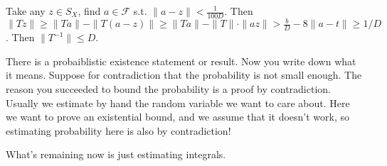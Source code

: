 Take any $z \in S_X$, find $a \in \mathcal{F}$ s.t. $\|a - z\| < \frac{1}{100D}$. Then $\|Tz\| \geq \|Ta\| - \|T(a - z)\| \geq \|Ta\| - \|T\|\cdot\|az\| > \frac{b}{D} - 8\|a - t\| \geq 1/D$.  Then $\|T^{-1}\| \leq D$. 

There is a probaiblistic existence statement or result. Now you write down what it means. Suppose for contradiction that the probability is not small enough. The reason you succeeded to bound the probability is a proof by contradiction. Usually we estimate by hand the random variable we want to care about. Here we want to prove an existential bound, and we assume that it doesn't work, so estimating probability here is also by contradiction! 

What's remaining now is just estimating integrals. 





